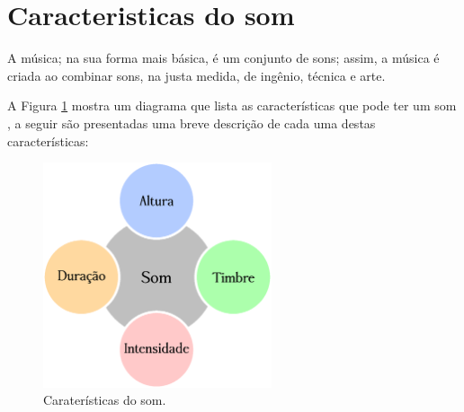 
\section{Caracteristicas do som}
\label{sec:carateristasom}
A música; na sua forma mais básica,  é um conjunto de sons; assim, 
a música é criada ao combinar sons, na justa medida, de 
ingênio, técnica e arte.

A Figura \ref{fig:carateristicas:som} mostra um diagrama
que lista as características que pode ter um som \cite[pp. 12]{medteoria}, 
a seguir são presentadas uma breve descrição de cada uma destas características:
\begin{figure}[!t]
\centering

\includegraphics[width=0.6\textwidth]{chapters/cap-musica-basica/caracteristicas-son-1.eps}
\caption{Caraterísticas do som.}
\label{fig:carateristicas:som}
\end{figure}
